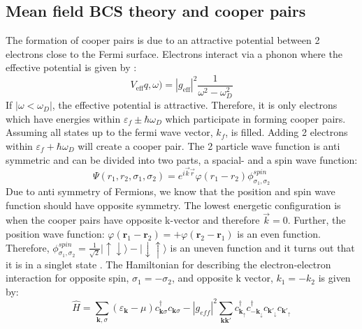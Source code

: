     \subsection{Mean field BCS theory and cooper pairs}
         The formation of cooper pairs is due to an attractive potential between 2 electrons close to the Fermi surface. Electrons interact via a phonon where the effective potential is given by \cite{Annett2004}: 
          \begin{equation}
            V_{\mathrm{eff}}{q}, \omega)=\left|g_{\mathrm{eff}}\right|^2 \frac{1}{\omega^2-\omega_D^2}
        \end{equation}
        If $|\omega < \omega_D|$, the effective potential is attractive. Therefore, it is only electrons which have energies within $\varepsilon_f \pm \hbar \omega_D$ which participate in forming cooper pairs. Assuming all states up to the fermi wave vector, $k_f$, is filled. Adding 2 electrons within $\varepsilon_f +\hbar \omega_D$ will create a cooper pair. The 2 particle wave function is anti symmetric and can be divided into two parts, a spacial- and a spin wave function: 
        \begin{equation}
            \Psi(r_1,r_2,\sigma_1,\sigma_2) = e^{i\Vec{k}\Vec{r}} \varphi(r_1-r_2) \phi^{spin}_{\sigma_1,\sigma_2}
        \end{equation}
        Due to anti symmetry of Fermions, we know that the position and spin wave function should have opposite symmetry. The lowest energetic configuration is when the cooper pairs have opposite k-vector and therefore $\Vec{k}=0$. Further, the position wave function: $\varphi\left(\mathbf{r}_1-\mathbf{r}_2\right) = + \varphi\left(\mathbf{r}_2-\mathbf{r}_1\right)$ is an even function. Therefore, $\phi^{spin}_{\sigma_1,\sigma_2} = \frac{1}{\sqrt{2} }|\uparrow \downarrow \rangle - |\downarrow \uparrow \rangle $ is an uneven function and it turns out that it is in a singlet state \cite{Annett2004}.
        \newline
        \newline
        The  Hamiltonian for describing the electron-electron interaction for opposite spin, $\sigma_1=-\sigma_2$,  and opposite k vector, $k_1=-k_2$ is given by\cite{Annett2004}: 
        \begin{equation}\label{Hamiltonian_BCS}
            \hat{H}=\sum_{\mathbf{k}, \sigma} (\varepsilon_{\mathbf{k}}-\mu) c_{\mathbf{k} \sigma}^{\dagger} c_{\mathbf{k} \sigma}-\left|g_{eff}\right|^2 \sum_{\mathbf{k} \mathbf{k'}} c_{\mathbf{k}_{\uparrow}}^{\dagger} c_{-\mathbf{k}_{\downarrow}}^{\dagger} c_{\mathbf{k'}_{\downarrow}} c_{\mathbf{k'}_{\uparrow}} 
        \end{equation}
